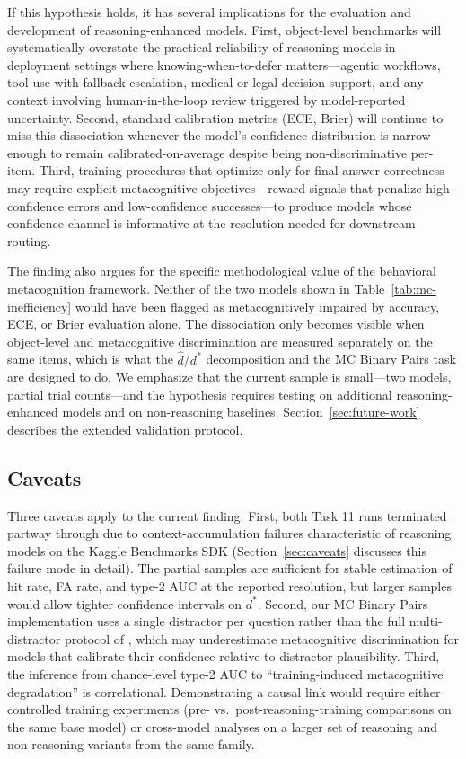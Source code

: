 If this hypothesis holds, it has several implications for the evaluation and development of reasoning-enhanced models. First, object-level benchmarks will systematically overstate the practical reliability of reasoning models in deployment settings where knowing-when-to-defer matters---agentic workflows, tool use with fallback escalation, medical or legal decision support, and any context involving human-in-the-loop review triggered by model-reported uncertainty. Second, standard calibration metrics (ECE, Brier) will continue to miss this dissociation whenever the model's confidence distribution is narrow enough to remain calibrated-on-average despite being non-discriminative per-item. Third, training procedures that optimize only for final-answer correctness may require explicit metacognitive objectives---reward signals that penalize high-confidence errors and low-confidence successes---to produce models whose confidence channel is informative at the resolution needed for downstream routing.

The finding also argues for the specific methodological value of the behavioral metacognition framework. Neither of the two models shown in Table~\ref{tab:mc-inefficiency} would have been flagged as metacognitively impaired by accuracy, ECE, or Brier evaluation alone. The dissociation only becomes visible when object-level and metacognitive discrimination are measured separately on the same items, which is what the $\hat{d}$/$d^{*}$ decomposition and the MC Binary Pairs task are designed to do. We emphasize that the current sample is small---two models, partial trial counts---and the hypothesis requires testing on additional reasoning-enhanced models and on non-reasoning baselines. Section~\ref{sec:future-work} describes the extended validation protocol.

\subsection{Caveats}
\label{sec:mc-caveats}

Three caveats apply to the current finding. First, both Task 11 runs terminated partway through due to context-accumulation failures characteristic of reasoning models on the Kaggle Benchmarks SDK (Section~\ref{sec:caveats} discusses this failure mode in detail). The partial samples are sufficient for stable estimation of hit rate, FA rate, and type-2 AUC at the reported resolution, but larger samples would allow tighter confidence intervals on $d^{*}$. Second, our MC Binary Pairs implementation uses a single distractor per question rather than the full multi-distractor protocol of \citet{wang2025metasdt}, which may underestimate metacognitive discrimination for models that calibrate their confidence relative to distractor plausibility. Third, the inference from chance-level type-2 AUC to ``training-induced metacognitive degradation'' is correlational. Demonstrating a causal link would require either controlled training experiments (pre- vs.\ post-reasoning-training comparisons on the same base model) or cross-model analyses on a larger set of reasoning and non-reasoning variants from the same family.
